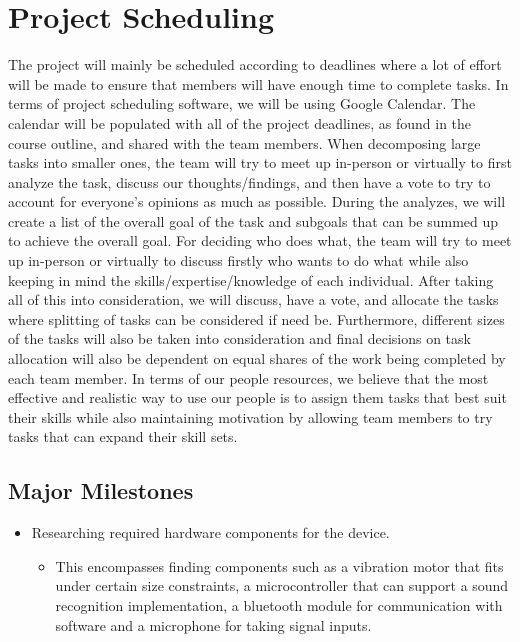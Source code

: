 \documentclass{article}
\begin{document}
\section{Project Scheduling}

The project will mainly be scheduled according to deadlines where a lot of effort
will be made to ensure that members will have enough time to complete tasks.
In terms of project scheduling software, we will be using Google Calendar.
The calendar will be populated with all of the project deadlines, as found in the
course outline, and shared with the team members. When decomposing large
tasks into smaller ones, the team will try to meet up in-person or virtually to
first analyze the task, discuss our thoughts/findings, and then have a vote to try
to account for everyone’s opinions as much as possible. During the analyzes, we
will create a list of the overall goal of the task and subgoals that can be summed
up to achieve the overall goal. For deciding who does what, the team will try to
meet up in-person or virtually to discuss firstly who wants to do what while also
keeping in mind the skills/expertise/knowledge of each individual. After taking
all of this into consideration, we will discuss, have a vote, and allocate the tasks
where splitting of tasks can be considered if need be. Furthermore, different
sizes of the tasks will also be taken into consideration and final decisions on task
allocation will also be dependent on equal shares of the work being completed by
each team member. In terms of our people resources, we believe that the most
effective and realistic way to use our people is to assign them tasks that best
suit their skills while also maintaining motivation by allowing team members to
try tasks that can expand their skill sets.
\subsection*{Major Milestones}

\begin{itemize}
	\item Researching required hardware components for the device.
	\begin{itemize}
		\item This encompasses finding components such as a vibration motor that fits under certain size constraints, a microcontroller that can support a sound recognition implementation, a bluetooth module for communication with software and a microphone for taking signal inputs. 
	\end{itemize}
\end{itemize}
\end{document}
